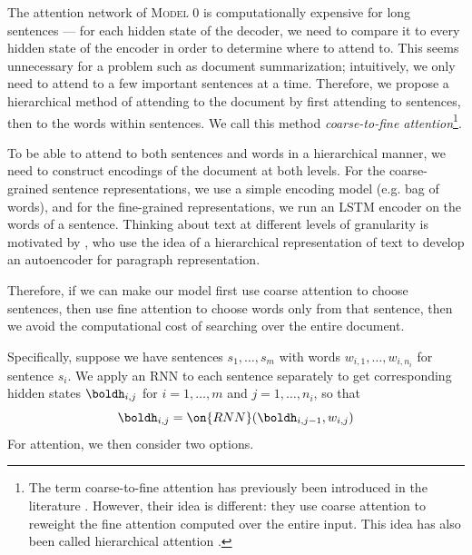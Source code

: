 \documentclass[12pt]{report}
\begin{document}
The attention network of \textsc{Model 0} is computationally expensive for long sentences --- for each hidden state of the decoder, we need to compare it to every hidden state of the encoder in order to determine where to attend to.
This seems unnecessary for a problem such as document summarization; intuitively, we only need to attend to a few important sentences at a time. Therefore, we propose a hierarchical method of attending to the document by first attending to sentences, then to the words within sentences. We call this method \emph{coarse-to-fine attention}\footnote{The term coarse-to-fine attention has previously been introduced in the literature \citep{mei2016}. However, their idea is different: they use coarse attention to reweight the fine attention computed over the entire input. This idea has also been called hierarchical attention \citep{nallapati2016seq2seq}.}.



To be able to attend to both sentences and words in a hierarchical manner, we need to construct encodings of the document at both levels. For the coarse-grained sentence representations, we use a simple encoding model (e.g. bag of words), and for the fine-grained representations, we run an LSTM encoder on the words of a sentence.
Thinking about text at different levels of granularity is motivated by \citet{li2015autoencoder}, who use the idea of a hierarchical representation of text to develop an autoencoder for paragraph representation.


Therefore, if we can make our model first use coarse attention to choose sentences, then use fine attention to choose words only from that sentence, then we avoid the computational cost of searching over the entire document.

Specifically, suppose we have sentences $s_1, \ldots, s_m$ with words $w_{i,1}, \ldots, w_{i,n_i}$ for sentence $s_i$. We apply an RNN to each sentence separately to get corresponding hidden states $\boldh_{i,j}$ for $i = 1, \ldots, m$ and $j = 1, \ldots, n_i$, so that
\begin{equation}
\boldh_{i,j} = \on{RNN}(\boldh_{i,j-1}, w_{i,j})
\end{equation}
For attention, we then consider two options.
\end{document}
